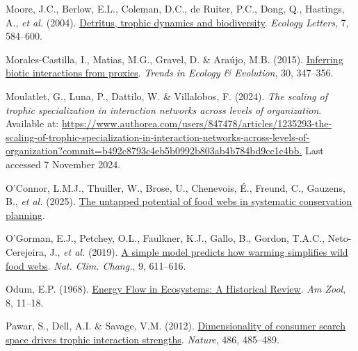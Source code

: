 \documentclass[
]{article}
\newlength{\cslhangindent}
\newenvironment{CSLReferences}[2] %
 {\begin{list}{}{%
  \setlength{\itemindent}{0pt}
  \setlength{\leftmargin}{0pt}
  \setlength{\parsep}{0pt}
  \ifodd #1
   \setlength{\leftmargin}{\cslhangindent}
   \setlength{\itemindent}{-1\cslhangindent}
  \fi
  \setlength{\itemsep}{#2\baselineskip}}}
 {\end{list}}
\begin{document}
\begin{CSLReferences}{1}{0}
Moore, J.C., Berlow, E.L., Coleman, D.C., de Ruiter, P.C., Dong, Q.,
Hastings, A., \emph{et al.} (2004).
\href{https://doi.org/10.1111/j.1461-0248.2004.00606.x}{Detritus,
trophic dynamics and biodiversity}. \emph{Ecology Letters}, 7, 584--600.

Morales-Castilla, I., Matias, M.G., Gravel, D. \& Araújo, M.B. (2015).
\href{https://doi.org/10.1016/j.tree.2015.03.014}{Inferring biotic
interactions from proxies}. \emph{Trends in Ecology \& Evolution}, 30,
347--356.

Moulatlet, G., Luna, P., Dattilo, W. \& Villalobos, F. (2024). \emph{The
scaling of trophic specialization in interaction networks across levels
of organization}. Available at:
\href{https://www.authorea.com/users/847478/articles/1235293-the-scaling-of-trophic-specialization-in-interaction-networks-across-levels-of-organization?commit=b492c8793c4eb5b0992b803ab4b784bd9cc1c4bb}{https://www.authorea.com/users/847478/articles/1235293-the-scaling-of-trophic-specialization-in-interaction-networks-across-levels-of-organization?commit=b492c8793c4eb5b0992b803ab4b784bd9cc1c4bb.}
Last accessed 7 November 2024.

O'Connor, L.M.J., Thuiller, W., Brose, U., Chenevois, É., Freund, C.,
Gauzens, B., \emph{et al.} (2025).
\href{https://hal.science/hal-05331872}{The untapped potential of food
webs in systematic conservation planning}.

O'Gorman, E.J., Petchey, O.L., Faulkner, K.J., Gallo, B., Gordon,
T.A.C., Neto-Cerejeira, J., \emph{et al.} (2019).
\href{https://doi.org/10.1038/s41558-019-0513-x}{A simple model predicts
how warming simplifies wild food webs}. \emph{Nat. Clim. Chang.}, 9,
611--616.

Odum, E.P. (1968). \href{https://doi.org/10.1093/icb/8.1.11}{Energy
{Flow} in {Ecosystems}: {A Historical Review}}. \emph{Am Zool}, 8,
11--18.

Pawar, S., Dell, A.I. \& Savage, V.M. (2012).
\href{https://doi.org/10.1038/nature11131}{Dimensionality of consumer
search space drives trophic interaction strengths}. \emph{Nature}, 486,
485--489.


\end{CSLReferences}
\end{document}
